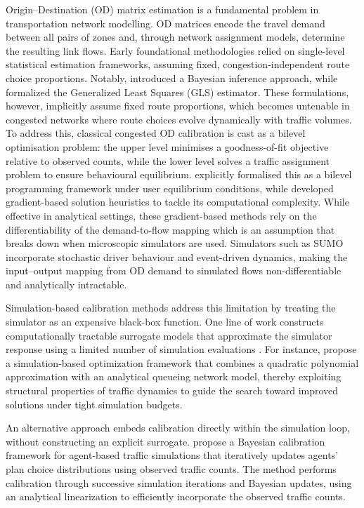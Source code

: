 \documentclass[11pt]{article}
\begin{document}
Origin–Destination (OD) matrix estimation is a fundamental problem in transportation network modelling. OD matrices encode the travel demand between all pairs of zones and, through network assignment models, determine the resulting link flows. Early foundational methodologies relied on single-level statistical estimation frameworks, assuming fixed, congestion-independent route choice proportions. Notably, \textcite{maher1983inferences} introduced a Bayesian inference approach, while \textcite{cascetta1984estimation} formalized the Generalized Least Squares (GLS) estimator.
These formulations, however, implicitly assume fixed route proportions, which becomes untenable in congested networks where route choices evolve dynamically with traffic volumes. To address this, classical congested OD calibration is cast as a bilevel optimisation problem: the upper level minimises a goodness-of-fit objective relative to observed counts, while the lower level solves a traffic assignment problem to ensure behavioural equilibrium. \textcite{yang1992estimation} explicitly formalised this as a bilevel programming framework under user equilibrium conditions, while \textcite{spiess1990gradient} developed gradient-based solution heuristics to tackle its computational complexity.
While effective in analytical settings, these gradient-based methods rely on the differentiability of the demand-to-flow mapping which is an assumption that breaks down when microscopic simulators are used. Simulators such as SUMO incorporate stochastic driver behaviour and event-driven dynamics, making the input–output mapping from OD demand to simulated flows non-differentiable and analytically intractable.



Simulation-based calibration methods address this limitation by treating the
simulator as an expensive black-box function. One line of work constructs
computationally tractable surrogate models that approximate the simulator
response using a limited number of simulation evaluations
\parencite{osorio2013simulation, osorio2015computationally}. For instance,
\textcite{osorio2013simulation} propose a simulation-based optimization
framework that combines a quadratic polynomial approximation with an
analytical queueing network model, thereby exploiting structural properties of
traffic dynamics to guide the search toward improved solutions under tight
simulation budgets.




An alternative approach embeds calibration directly within the simulation loop, without constructing an explicit surrogate. \textcite{flotterod2011bayesian} propose a Bayesian calibration framework for agent-based traffic simulations that iteratively updates agents' plan choice distributions using observed traffic counts. The method performs calibration through successive simulation iterations and Bayesian updates, using an analytical linearization to efficiently incorporate the observed traffic counts.
\end{document}
